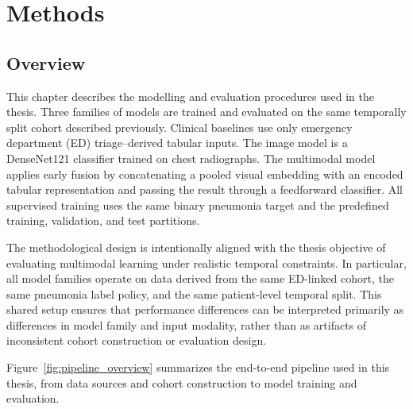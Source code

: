\chapter{Methods}

\section{Overview}

This chapter describes the modelling and evaluation procedures used in the thesis. Three families of models are trained and evaluated on the same temporally split cohort described previously. Clinical baselines use only emergency department (ED) triage--derived tabular inputs. The image model is a DenseNet121 classifier trained on chest radiographs. The multimodal model applies early fusion by concatenating a pooled visual embedding with an encoded tabular representation and passing the result through a feedforward classifier. All supervised training uses the same binary pneumonia target and the predefined training, validation, and test partitions.

The methodological design is intentionally aligned with the thesis objective of evaluating multimodal learning under realistic temporal constraints. In particular, all model families operate on data derived from the same ED-linked cohort, the same pneumonia label policy, and the same patient-level temporal split. This shared setup ensures that performance differences can be interpreted primarily as differences in model family and input modality, rather than as artifacts of inconsistent cohort construction or evaluation design.

Figure~\ref{fig:pipeline_overview} summarizes the end-to-end pipeline used in this thesis, from data sources and cohort construction to model training and evaluation.

